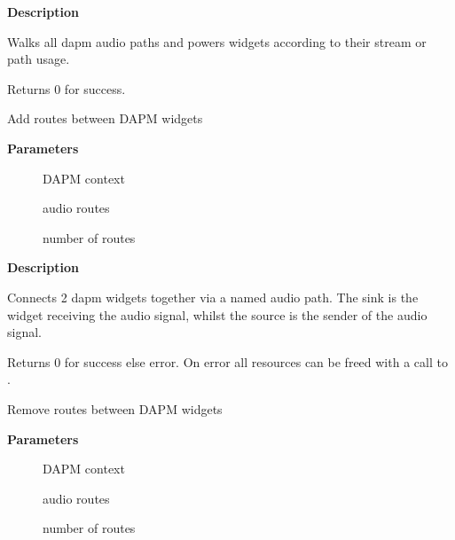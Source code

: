 \documentclass[a4paper,8pt,english]{sphinxmanual}
\begin{document}
\textbf{Description}

Walks all dapm audio paths and powers widgets according to their
stream or path usage.

Returns 0 for success.

\begin{fulllineitems}
\label{sound/kernel-api/alsa-driver-api:c.snd_soc_dapm_add_routes}
Add routes between DAPM widgets

\end{fulllineitems}


\textbf{Parameters}
\begin{description}
\item[{}] \leavevmode
DAPM context

\item[{}] \leavevmode
audio routes

\item[{}] \leavevmode
number of routes

\end{description}

\textbf{Description}

Connects 2 dapm widgets together via a named audio path. The sink is
the widget receiving the audio signal, whilst the source is the sender
of the audio signal.

Returns 0 for success else error. On error all resources can be freed
with a call to .

\begin{fulllineitems}
\label{sound/kernel-api/alsa-driver-api:c.snd_soc_dapm_del_routes}
Remove routes between DAPM widgets

\end{fulllineitems}


\textbf{Parameters}
\begin{description}
\item[{}] \leavevmode
DAPM context

\item[{}] \leavevmode
audio routes

\item[{}] \leavevmode
number of routes

\end{description}
\end{document}
